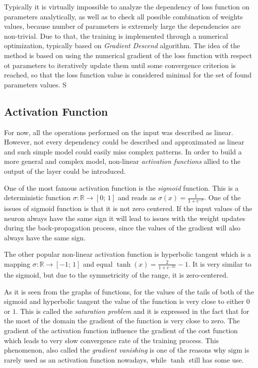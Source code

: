 Typically it is virtually impossible to analyze the dependency of loss function on parameters analytically, as well as to check all possible combination of weights values, because number of parameters is extremely large the dependencies are non-trivial. 
Due to that, the training is implemented through a numerical optimization, typically based on \textit{Gradient Descend} algorithm. 
The idea of the method is based on using the numerical gradient of the loss function with respect ot parameters to iteratively update them until some convergence criterion is reached, so that the loss function value is considered minimal for the set of found parameters values.
S



\subsection{Activation Function}

For now, all the operations performed on the input was described as linear.
However, not every dependency could be described and approximated as linear and such simple model could easily miss complex patterns.
In order to build a more general and complex model, non-linear \textit{activation functions} allied to the output of the layer could be introduced.

One of the most famous activation function is the \textit{sigmoid} function.
This is a deterministic function $ \sigma : \mathbb{R} \rightarrow [0; \, 1] $ and reads as $ \sigma(x) = \frac{1}{1+e^{-x}} $.
One of the issues of sigmoid function is that it is not zero centered.
If the input values of the neuron always have the same sign it will lead to issues with the weight updates during the back-propagation process, since the values of the gradient will also always have the same sign.

The other popular non-linear activation function is hyperbolic tangent which is a mapping $ \sigma : \mathbb{R} \rightarrow [-1; \, 1]$ and equal $\tanh(x)=\frac{2}{1+e^{-2x}}-1$.
It is very similar to the sigmoid, but due to the symmetricity of the range, it is zero-centered.

As it is seen from the graphs of functions, for the values of the tails of both of the sigmoid and hyperbolic tangent the value of the function is very close to either $0$ or $1$.
This is called the \textit{saturation problem} and it is expressed in the fact that for the most of the domain the gradient of the function is very close to zero.
The gradient of the activation function influence the gradient of the cost function which leads to very slow convergence rate of the training process.
This phenomenon, also called the \textit{gradient vanishing} is one of the reasons why $\mathrm{sigm}$ is rarely used as an activation function nowadays, while $\tanh$ still has some use.

